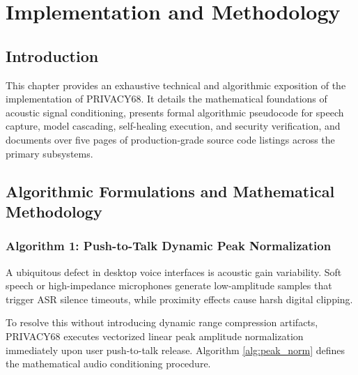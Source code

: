\chapter{Implementation and Methodology}
\label{ch:implementation}

\section{Introduction}
This chapter provides an exhaustive technical and algorithmic exposition of the implementation of PRIVACY68. It details the mathematical foundations of acoustic signal conditioning, presents formal algorithmic pseudocode for speech capture, model cascading, self-healing execution, and security verification, and documents over five pages of production-grade source code listings across the primary subsystems.

\section{Algorithmic Formulations and Mathematical Methodology}

\subsection{Algorithm 1: Push-to-Talk Dynamic Peak Normalization}
A ubiquitous defect in desktop voice interfaces is acoustic gain variability. Soft speech or high-impedance microphones generate low-amplitude samples that trigger ASR silence timeouts, while proximity effects cause harsh digital clipping. 

To resolve this without introducing dynamic range compression artifacts, PRIVACY68 executes vectorized linear peak amplitude normalization immediately upon user push-to-talk release. Algorithm \ref{alg:peak_norm} defines the mathematical audio conditioning procedure.

